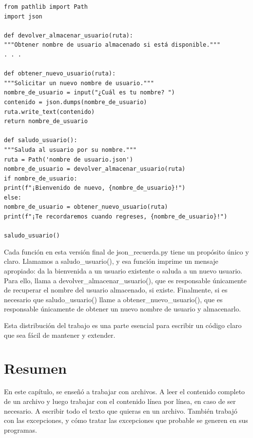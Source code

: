 \hspace{-2.6cm}{\ttfamily \scriptsize refactorizar}

\vspace{-0.2cm}
\hspace{-2.5cm}{\ttfamily \scriptsize \_saludo.py}\vspace{-0.82cm}
\begin{lstlisting}
from pathlib import Path
import json

def devolver_almacenar_usuario(ruta):
"""Obtener nombre de usuario almacenado si está disponible."""
. . .

def obtener_nuevo_usuario(ruta):
"""Solicitar un nuevo nombre de usuario."""
nombre_de_usuario = input("¿Cuál es tu nombre? ")
contenido = json.dumps(nombre_de_usuario)
ruta.write_text(contenido)
return nombre_de_usuario

def saludo_usuario():
"""Saluda al usuario por su nombre."""
ruta = Path('nombre de usuario.json')
nombre_de_usuario = devolver_almacenar_usuario(ruta)
if nombre_de_usuario:
print(f"¡Bienvenido de nuevo, {nombre_de_usuario}!")
else:
nombre_de_usuario = obtener_nuevo_usuario(ruta)
print(f"¡Te recordaremos cuando regreses, {nombre_de_usuario}!")

saludo_usuario()
\end{lstlisting}

Cada función en esta versión final de {\ttfamily json\_recuerda.py} tiene un propósito único y claro. Llamamos a {\ttfamily saludo\_usuario()}, y esa función imprime un mensaje apropiado: da la bienvenida a un usuario existente o saluda a un nuevo usuario. Para ello, llama a {\ttfamily devolver\_almacenar\_usuario()}, que es responsable únicamente de recuperar el nombre del usuario almacenado, si existe. Finalmente, si es necesario que {\ttfamily saludo\_usuario()} llame a {\ttfamily obtener\_nuevo\_usuario()}, que es responsable únicamente de obtener un nuevo nombre de usuario y almacenarlo.

Esta distribución del trabajo es una parte esencial para escribir un código claro que sea fácil de mantener y extender.


\section{Resumen}

En este capítulo, se enseñó  a trabajar con archivos. A leer el
contenido completo de un archivo y luego trabajar con el contenido línea por línea, en caso de ser 
necesario. A escribir todo el texto que quieras en un archivo. También trabajó con las excepciones,  y cómo tratar las excepciones que probable se generen en sus programas. 

